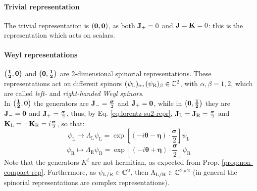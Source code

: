 \paragraph{Trivial representation}

The trivial representation is $ \mathbf{\left( 0,0 \right)} $, as both $ \mathbf{J}_{\pm} = 0 $ and $ \mathbf{J} = \mathbf{K} = 0 $: this is the representation which acts on scalars.

\paragraph{Weyl representations}

$ \mathbf{\left( \frac{1}{2},0 \right)} $ and $ \mathbf{\left( 0,\frac{1}{2} \right)} $ are 2-dimensional spinorial representations. These representations act on different spinors $ (\psi_\text{L})_\alpha , (\psi_\text{R})_\beta \in \mathbb{C}^2 $, with $ \alpha,\beta = 1,2 $, which are called \textit{left-} and \textit{right-handed  Weyl spinors}.\\
In $ \mathbf{\left( \frac{1}{2},0 \right)} $ the generators are $ \mathbf{J}_- = \frac{\boldsymbol{\sigma}}{2} $ and $ \mathbf{J}_+ = \mathbf{0} $, while in $ \mathbf{\left( 0,\frac{1}{2} \right)} $ they are $ \mathbf{J}_- = \mathbf{0} $ and $ \mathbf{J}_+ = \frac{\boldsymbol{\sigma}}{2} $, thus, by Eq. \ref{eq:lorentz-su2-repr}, $ \mathbf{J}_\text{L} = \mathbf{J}_\text{R} = \frac{\boldsymbol{\sigma}}{2} $ and $ \mathbf{K}_\text{L} = - \mathbf{K}_\text{R} = i \frac{\boldsymbol{\sigma}}{2} $, so that:
\begin{equation}
  \psi_\text{L} \mapsto \Lambda_\text{L} \psi_\text{L} = \exp \left[ \left( -i \boldsymbol{\theta} - \boldsymbol{\eta} \right) \cdot \frac{\boldsymbol{\sigma}}{2} \right] \psi_\text{L}
  \label{eq:lor-left-hand-weyl}
\end{equation}
\begin{equation}
  \psi_\text{R} \mapsto \Lambda_\text{R} \psi_\text{R} = \exp \left[ \left( -i \boldsymbol{\theta} + \boldsymbol{\eta} \right) \cdot \frac{\boldsymbol{\sigma}}{2} \right] \psi_\text{R}
  \label{eq:lor-right-hand-weyl}
\end{equation}
Note that the generators $ K^i $ are not hermitian, as expected from Prop. \ref{prop:non-compact-rep}. Furthermore, as $ \psi_{\text{L}/\text{R}} \in \mathbb{C}^2 $, then $ \Lambda_{\text{L}/\text{R}} \in \mathbb{C}^{2 \times 2} $ (in general the spinorial representations are complex representations).


